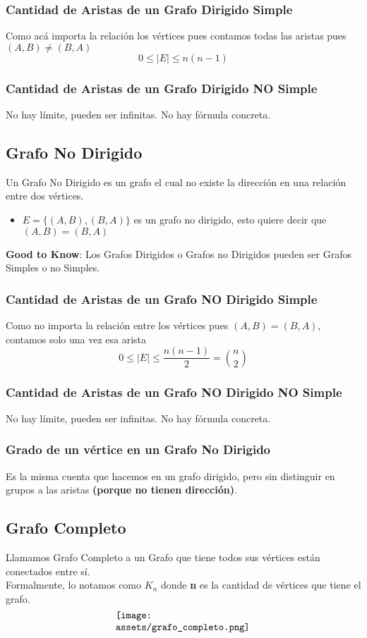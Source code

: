 \documentclass[10pt,a4paper]{article}
\begin{document}
\subsubsection*{Cantidad de Aristas de un Grafo Dirigido Simple}
Como acá importa la relación los vértices pues contamos todas las aristas pues $(A,B) \neq (B,A)$ \[0 \leq |E| \leq n(n-1)\]
\subsubsection*{Cantidad de Aristas de un Grafo Dirigido NO Simple}
No hay límite, pueden ser infinitas. No hay fórmula concreta.
\subsection*{Grafo No Dirigido}
Un Grafo No Dirigido es un grafo el cual no existe la dirección en una relación entre dos vértices.
\begin{itemize}
    \item $E = \{(A,B), (B, A) \}$ es un grafo no dirigido, esto quiere decir que $(A,B) = (B, A)$
\end{itemize}
\textbf{Good to Know}: Los Grafos Dirigidos o Grafos no Dirigidos pueden ser Grafos Simples o no Simples.
\subsubsection*{Cantidad de Aristas de un Grafo NO Dirigido Simple}
Como no importa la relación entre los vértices pues $(A,B) = (B,A)$, contamos solo una vez esa arista \[0 \leq |E| \leq \frac{n(n-1)}{2} = \binom{n}{2}\]
\subsubsection*{Cantidad de Aristas de un Grafo NO Dirigido NO Simple}
No hay límite, pueden ser infinitas. No hay fórmula concreta.
\subsubsection*{Grado de un vértice en un Grafo No Dirigido}
Es la misma cuenta que hacemos en un grafo dirigido, pero sin distinguir en grupos a las aristas \textbf{(porque no tienen dirección)}.
\subsection*{Grafo Completo}
Llamamos Grafo Completo a un Grafo que tiene todos sus vértices están conectados entre sí. \\
Formalmente, lo notamos como $K_{n}$ donde \textbf{n} es la cantidad de vértices que tiene el grafo.
\[\begin{minipage}[b]{0.4\textwidth} 
    \texttt{[image: assets/grafo\_completo.png]}
\end{minipage}\]
\end{document}
